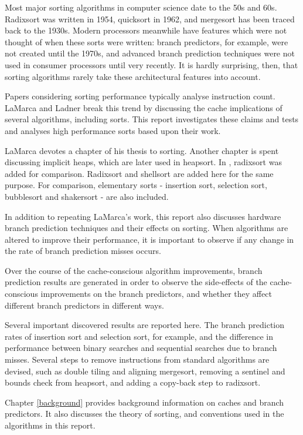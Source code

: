 \label{intro}
Most major sorting algorithms in computer science date to the 50s and 60s.
Radixsort was written in 1954, quicksort in 1962, and mergesort has been traced
back to the 1930s. Modern processors meanwhile have features which were not
thought of when these sorts were written: branch predictors, for example, were
not created until the 1970s, and advanced branch prediction techniques were not
used in consumer processors until very recently. It is hardly surprising, then,
that sorting algorithms rarely take these architectural features into account.

Papers considering sorting performance typically analyse instruction count.
LaMarca and Ladner \cite{LaMarca96} break this trend by discussing the cache
implications of several algorithms, including sorts. This report investigates
these claims and tests and analyses high performance sorts based upon their
work.

LaMarca devotes a chapter of his thesis to sorting. Another chapter is spent
discussing implicit heaps, which are later used in heapsort. In
\cite{LaMarca99}, radixsort was added for comparison. Radixsort and shellsort
are added here for the same purpose. For comparison, elementary sorts -
insertion sort, selection sort, bubblesort and shakersort - are also included.


In addition to repeating LaMarca's work, this report also discusses hardware
branch prediction techniques and their effects on sorting. When algorithms are
altered to improve their performance, it is important to observe if any change
in the rate of branch prediction misses occurs.

Over the course of the cache-conscious algorithm improvements, branch prediction
results are generated in order to observe the side-effects of the
cache-conscious improvements on the branch predictors, and whether they affect
different branch predictors in different ways. 

Several important discovered results are reported here. The branch prediction
rates of insertion sort and selection sort, for example, and the difference in
performance between binary searches and sequential searches due to branch
misses. Several steps to remove instructions from standard algorithms are
devised, such as double tiling and aligning mergesort, removing a sentinel and
bounds check from heapsort, and adding a copy-back step to radixsort.


Chapter \ref{background} provides background information on caches and branch
predictors. It also discusses the theory of sorting, and conventions used in the
algorithms in this report.

